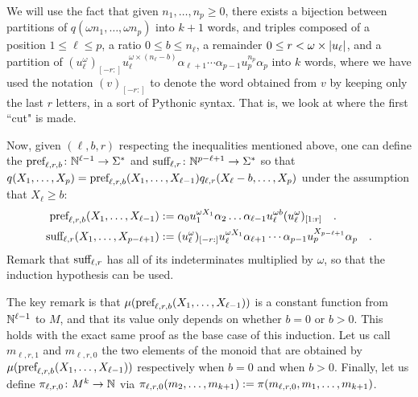 \begin{proofof}
	We will use the fact that given $n_1, \dots, n_p \geq 0$,
	there exists a bijection between
	partitions of $q(\omega n_1, \dots, \omega n_p)$
	into $k+1$ words, and
	triples composed of
	a position  $1 \leq \ell \leq p$,
	a ratio     $0 \leq b \leq n_\ell$,
	a remainder $0 \leq r < \omega \times \card{u_\ell}$,
	and a partition of
	$(u_\ell^\omega)_{[-r:]} u_\ell^{\omega \times (n_\ell - b)}
		\alpha_{\ell+1} \cdots \alpha_{p-1} u_p^{n_p} \alpha_{p}$
	into $k$ words,
	where we have used the notation
	$(v)_{[-r:]}$ to denote the word obtained from $v$
	by keeping only the last $r$ letters, in a sort of Pythonic syntax.
	That is, we look at where the first ``cut" is made.

	Now, given $(\ell, b, r)$ respecting the inequalities
	mentioned above,
	one can define the 
	$\text{pref}_{\ell,r,b} \colon \mathbb{N}^{\ell - 1} \to \Sigma^*$
	and
	$\text{suff}_{\ell,r} \colon \mathbb{N}^{p - \ell + 1} \to \Sigma^*$
	so that
	$q(X_1, \dots, X_p) = \text{pref}_{\ell,r,b}(X_1, \dots, X_{\ell-1})
		q_{\ell, r}(X_{\ell} - b, \dots, X_p)$
	under the assumption that $X_\ell \geq b$:
	\begin{align*}
        \text{pref}_{\ell,r,b}(X_1, \dots, X_{\ell - 1})
        &\mathrel{:=}
        \alpha_0 u_1^{\omega X_1} \alpha_2 \dots \alpha_{\ell - 1}
        u_\ell^{\omega b} (u_{\ell}^\omega)_{[1:r]}
        \quad .
        \\
		\text{suff}_{\ell,r}(X_{1}, \dots, X_{p - \ell + 1})
        &\mathrel{:=}
        (u_\ell^\omega)_{[-r:]} u_\ell^{\omega X_1}
		\alpha_{\ell+1} \cdots \alpha_{p-1} u_p^{X_{p - \ell + 1}} \alpha_{p}
		\quad .
	\end{align*}
	Remark that $\text{suff}_{\ell,r}$ has all of its indeterminates
	multiplied by $\omega$, so that the induction hypothesis
	can be used.

	The key remark is that $\mu(\text{pref}_{\ell,r,b}(X_1, \dots, X_{\ell - 1}))$ is a
	constant function from $\mathbb{N}^{\ell-1}$ to $M$, and that its value
	only depends on whether $b = 0$ or $b > 0$.
	This holds with
	the exact same proof as the base case of this induction. Let us call
	$m_{\ell,r,1}$ and $m_{\ell,r,0}$ the two elements of the monoid that are
	obtained by $\mu(\text{pref}_{\ell,r,b}(X_1, \dots, X_{\ell-1}))$ respectively when
	$b = 0$ and when $b > 0$. Finally, let us define $\pi_{\ell,r,0} \colon M^k
		\to \mathbb{N}$ via $\pi_{\ell,r,0}(m_2, \dots, m_{k+1}) \mathrel{:=}
		\pi(m_{\ell,r,0}, m_1, \dots, m_{k+1})$.


\end{proofof}
